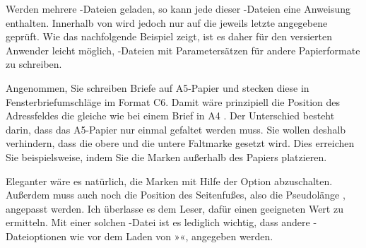 Werden %
mehrere -Dateien geladen, so kann jede dieser
-Dateien eine Anweisung 
enthalten. Innerhalb von  wird
jedoch nur auf die jeweils letzte angegebene  geprüft. Wie
das nachfolgende Beispiel zeigt, ist es daher für den versierten Anwender
leicht möglich, -Dateien mit Parametersätzen für andere
Papierformate zu schreiben. %

\begin{Example}
  \iffalse%
  Nehmen wir einmal an, dass Sie A5-Papier in normaler Ausrichtung, also
  hochkant oder portrait, für Ihre Briefe verwenden. Nehmen wir weiter an,
  dass Sie diese in normale Fensterbriefumschläge im Format C6 stecken. %
  \else%
  Angenommen, Sie schreiben Briefe auf A5-Papier und stecken diese in
  Fensterbriefumschläge im Format C6. %
  \fi%
  Damit wäre prinzipiell die Position des Adressfeldes die gleiche wie bei
  einem %
  \iffalse normalen Brief in A4 nach DIN\else Brief in A4\fi %
  . Der Unterschied besteht %
  darin, dass das A5-Papier nur einmal gefaltet werden muss. Sie wollen
  deshalb verhindern, dass die obere und die untere Faltmarke gesetzt
  wird. Dies erreichen Sie beispielsweise, indem Sie die Marken außerhalb des
  Papiers platzieren.
  Eleganter wäre es natürlich, die Marken mit Hilfe der Option
   abzuschalten.  Außerdem muss auch noch
  die Position des Seitenfußes, also die Pseudolänge
  ,
  angepasst werden. Ich überlasse es dem Leser, dafür einen geeigneten Wert zu
  ermitteln. Mit einer solchen -Datei ist es lediglich wichtig, dass
  andere -Dateioptionen wie  vor dem Laden von
  »«, angegeben werden.
\end{Example}
%
\EndIndexGroup%
\EndIndexGroup%
\ExampleEndFix


